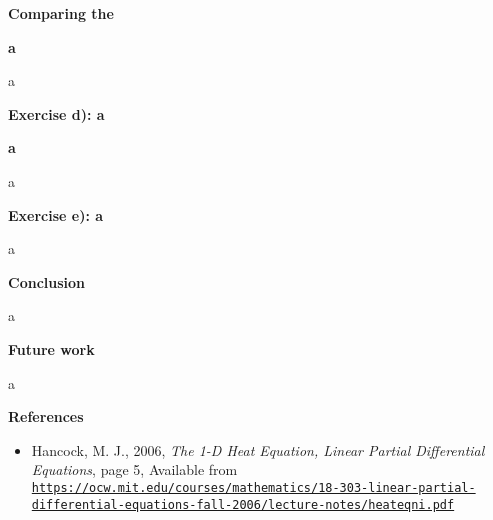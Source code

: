 \documentclass[12pt,a4paper]{article}
\begin{document}
\begin{center}
\large{\textbf{Comparing the }}
\end{center}

\begin{center}
\large{\textbf{a}}
\end{center}

\noindent a

\newpage

\begin{center}
\Large{\textbf{Exercise d): a}}
\end{center}

\begin{center}
\large{\textbf{a}}
\end{center}

\noindent a

\newpage

\begin{center}
\Large{\textbf{Exercise e): a}}
\end{center}

\noindent a

\newpage

\begin{center}
\Large{\textbf{Conclusion}}
\end{center}

\noindent a

\newpage

\begin{center}
\Large{\textbf{Future work}}
\end{center}

\noindent a

\newpage

\begin{center}
\Large{\textbf{References}}
\end{center}

\begin{itemize}
  \item Hancock, M. J., 2006, \emph{The 1-D Heat Equation, Linear Partial Differential Equations}, page 5, Available from \href{{https://ocw.mit.edu/courses/mathematics/18-303-linear-partial-differential-equations-fall-2006/lecture-notes/heateqni.pdf}}{\nolinkurl{https://ocw.mit.edu/courses/mathematics/18-303-linear-partial-differential-equations-fall-2006/lecture-notes/heateqni.pdf}}
\end{itemize}
\end{document}
